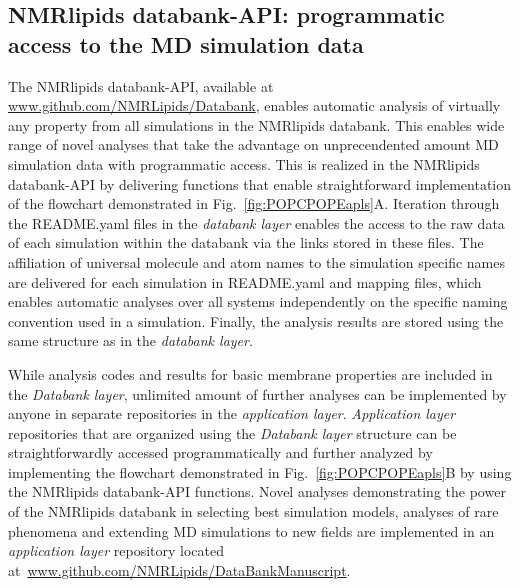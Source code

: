 \documentclass[fleqn,10pt]{wlscirep}
\begin{document}
\subsection{NMRlipids databank-API: programmatic access to the MD simulation data}
The NMRlipids databank-API, available at \url{www.github.com/NMRLipids/Databank}, enables automatic analysis of virtually any property from all simulations in the NMRlipids databank. This enables wide range of novel analyses that take the advantage on unprecendented amount MD simulation data with programmatic access. This is realized in the NMRlipids databank-API by delivering functions that enable straightforward implementation of the flowchart demonstrated in Fig.~\ref{fig:POPCPOPEapls}A. Iteration through the README.yaml files in the {\it databank layer} enables the access to the raw data of each simulation within the databank via the links stored in these files. The affiliation of universal molecule and atom names to the simulation specific names are delivered for each simulation in README.yaml and mapping files, which enables automatic analyses over all systems independently on the specific naming convention used in a simulation. Finally, the analysis results are stored using the same structure as in the {\it databank layer}. 

While analysis codes and results for basic membrane properties 
are included in the {\it Databank layer}, unlimited amount of further analyses can be implemented by anyone in separate repositories in the {\it application layer}. {\it Application layer} repositories that are organized using the {\it Databank layer} structure can be straightforwardly accessed programmatically and further analyzed by implementing the flowchart demonstrated in Fig.~\ref{fig:POPCPOPEapls}B by using the NMRlipids databank-API functions. Novel analyses demonstrating the power of the NMRlipids databank in selecting best simulation models, analyses of rare phenomena and extending MD simulations to new fields are implemented in an {\it application layer} repository located at~\url{www.github.com/NMRLipids/DataBankManuscript}.

\end{document}
